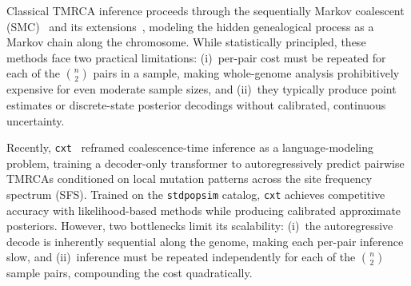 \documentclass{article}
\begin{document}
Classical TMRCA inference proceeds through the sequentially Markov coalescent
(SMC)~\citep{mcvean2005approximating, li2011inference} and its
extensions~\citep{terhorst2017robust, speidel2019method}, modeling the hidden genealogical
process as a Markov chain along the chromosome. While statistically principled, these methods
face two practical limitations: (i)~per-pair cost must be repeated for each of the
$\binom{n}{2}$ pairs in a sample, making whole-genome analysis prohibitively expensive for
even moderate sample sizes, and (ii)~they typically produce point estimates or discrete-state
posterior decodings without calibrated, continuous uncertainty.

Recently, \texttt{cxt}~\citep{korfmann2025cxt} reframed coalescence-time inference as a
language-modeling problem, training a decoder-only transformer to autoregressively predict
pairwise TMRCAs conditioned on local mutation patterns across the site frequency spectrum
(SFS). Trained on the \texttt{stdpopsim} catalog, \texttt{cxt} achieves competitive accuracy
with likelihood-based methods while producing calibrated approximate posteriors. However,
two bottlenecks limit its scalability: (i)~the autoregressive decode is inherently sequential
along the genome, making each per-pair inference slow, and (ii)~inference must be repeated
independently for each of the $\binom{n}{2}$ sample pairs, compounding the cost
quadratically.
\end{document}
